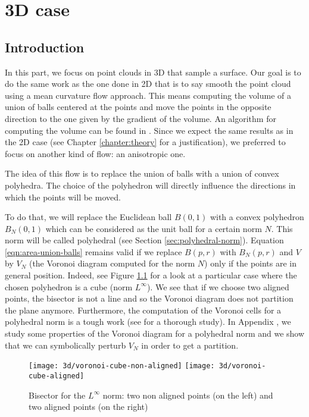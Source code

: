 \chapter{3D case}
\label{chapter:3d}

\section{Introduction}

In this part, we focus on point clouds in 3D that sample a surface. Our goal is
to do the same work as the one done in 2D that is to say smooth the point cloud
using a mean curvature flow approach. This means computing the volume of a union
of balls centered at the points and move the points in the opposite direction to
the one given by the gradient of the volume. An algorithm for computing the
volume can be found in \cite{cazals2011computing}. Since we expect the same
results as in the 2D case (see Chapter \ref{chapter:theory} for a
justification), we preferred to focus on another kind of flow: an anisotropic
one.

The idea of this flow is to replace the union of balls with a union of convex
polyhedra. The choice of the polyhedron will directly influence the directions
in which the points will be moved.

To do that, we will replace the Euclidean ball $ B(0, 1) $ with a convex
polyhedron $ B_N(0, 1) $ which can be considered as the unit ball for a certain
norm $ N $. This norm will be called polyhedral (see Section
\ref{sec:polyhedral-norm}). Equation \eqref{eqn:area-union-balls} remains valid
if we replace $ B(p, r) $ with $ B_N(p, r) $ and $ V $ by $ V_N $ (the Voronoi
diagram computed for the norm $ N $) only if the points are in general position.
Indeed, see Figure \ref{fig:3d-voronoi-cube} for a look at a particular case
where the chosen polyhedron is a cube (norm $ L^\infty $). We see that if we
choose two aligned points, the bisector is not a line and so the Voronoi diagram
does not partition the plane anymore. Furthermore, the computation of the
Voronoi cells for a polyhedral norm is a tough work (see \cite{ma2000bisectors}
for a thorough study). In Appendix
, we study some properties of the
Voronoi diagram for a polyhedral norm and we show that we can symbolically
perturb $ V_N $ in order to get a partition.

\begin{figure}[h]
    \centering

    \texttt{[image: 3d/voronoi-cube-non-aligned]}
    \hspace{2cm}
    \texttt{[image: 3d/voronoi-cube-aligned]}
    \caption{Bisector for the $ L^\infty $ norm: two non aligned points (on the
        left) and two aligned points (on the right)}
    \label{fig:3d-voronoi-cube}
\end{figure}

